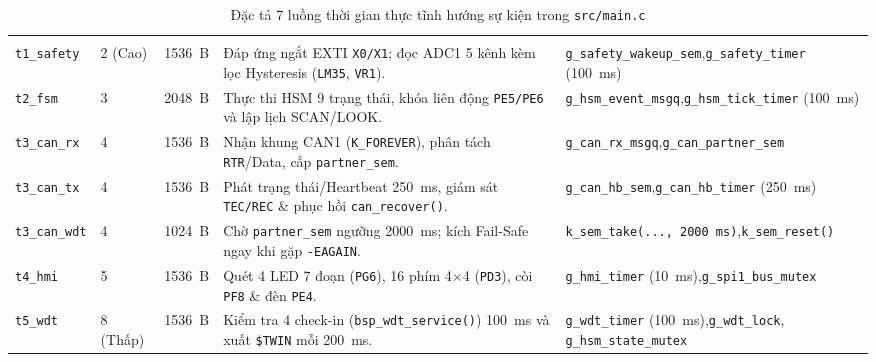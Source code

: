 \begingroup
\renewcommand{\arraystretch}{1.20}%
\setlength{\tabcolsep}{4.5pt}%
\fontsize{8.1}{10.4}\selectfont
{}%
\begin{xltabular}{\textwidth}{|L{2.1cm}|C{1.4cm}|C{1.4cm}|Y|L{3.7cm}|}
\caption{Đặc tả 7 luồng thời gian thực tĩnh hướng sự kiện trong \texttt{src/main.c}}\label{tab:threads}\\
\hline
{}
 &  &  &  &  \\
\hline
\endfirsthead
\hline
{}
 &  &  &  &  \\
\hline
\endhead
\hline
\endfoot
\hline
\endlastfoot
\texttt{t1\_safety} & 2 (Cao) & 1536~B & Đáp ứng ngắt EXTI \texttt{X0/X1}; đọc ADC1 5 kênh kèm lọc Hysteresis (\texttt{LM35}, \texttt{VR1}). & \texttt{g\_safety\_wakeup\_sem},\newline\texttt{g\_safety\_timer} (100~ms) \\
\hline
{}
\texttt{t2\_fsm} & 3 & 2048~B & Thực thi HSM 9 trạng thái, khóa liên động \texttt{PE5/PE6} và lập lịch SCAN/LOOK. & \texttt{g\_hsm\_event\_msgq},\newline\texttt{g\_hsm\_tick\_timer} (100~ms) \\
\hline
\texttt{t3\_can\_rx} & 4 & 1536~B & Nhận khung CAN1 (\texttt{K\_FOREVER}), phân tách \texttt{RTR}/Data, cấp \texttt{partner\_sem}. & \texttt{g\_can\_rx\_msgq},\newline\texttt{g\_can\_partner\_sem} \\
\hline
{}
\texttt{t3\_can\_tx} & 4 & 1536~B & Phát trạng thái/Heartbeat 250~ms, giám sát \texttt{TEC/REC} \& phục hồi \texttt{can\_recover()}. & \texttt{g\_can\_hb\_sem},\newline\texttt{g\_can\_hb\_timer} (250~ms) \\
\hline
\texttt{t3\_can\_wdt} & 4 & 1024~B & Chờ \texttt{partner\_sem} ngưỡng 2000~ms; kích Fail-Safe ngay khi gặp \texttt{-EAGAIN}. & \texttt{k\_sem\_take(..., 2000~ms)},\newline\texttt{k\_sem\_reset()} \\
\hline
{}
\texttt{t4\_hmi} & 5 & 1536~B & Quét 4 LED 7 đoạn (\texttt{PG6}), 16 phím 4$\times$4 (\texttt{PD3}), còi \texttt{PF8} \& đèn \texttt{PE4}. & \texttt{g\_hmi\_timer} (10~ms),\newline\texttt{g\_spi1\_bus\_mutex} \\
\hline
\texttt{t5\_wdt} & 8 (Thấp) & 1536~B & Kiểm tra 4 check-in (\texttt{bsp\_wdt\_service()}) 100~ms và xuất \texttt{\$TWIN} mỗi 200~ms. & \texttt{g\_wdt\_timer} (100~ms),\newline\texttt{g\_wdt\_lock}, \texttt{g\_hsm\_state\_mutex} \\
\end{xltabular}
\endgroup

